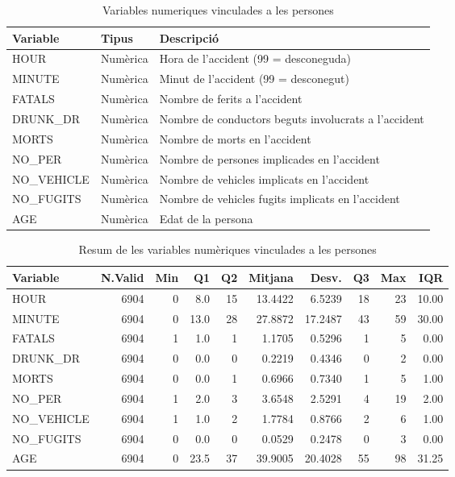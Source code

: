 \documentclass[11pt,longbibliography]{article}
\theoremstyle{definition}
\theoremstyle{remark}
\begin{document}
\begin{table}[H]
\centering
\begin{tabular}{lll}
\hline
Variable    & Tipus    & Descripció                                           \\ \hline
HOUR        & Numèrica & Hora de l’accident (99 = desconeguda)                \\
MINUTE      & Numèrica & Minut de l’accident (99 = desconegut)                \\
FATALS      & Numèrica & Nombre de ferits a l’accident                        \\
DRUNK\_DR   & Numèrica & Nombre de conductors beguts involucrats a l’accident \\
MORTS       & Numèrica & Nombre de morts en l’accident                        \\
NO\_PER     & Numèrica & Nombre de persones implicades en l’accident          \\
NO\_VEHICLE & Numèrica & Nombre de vehicles implicats en l’accident           \\
NO\_FUGITS  & Numèrica & Nombre de vehicles fugits implicats en l’accident    \\
AGE         & Numèrica & Edat de la persona                                   \\ \hline
\end{tabular}
\caption{Variables numeriques vinculades a les persones}
\label{tab:num3-table}
\end{table}

\begin{table}[H]
\centering
\begin{tabular}{lrrrrrrrrr}
\hline
Variable    & N.Valid & Min & Q1   & Q2 & Mitjana    & Desv. & Q3 & Max & IQR   \\ \hline
HOUR        & 6904    & 0   & 8.0  & 15      & 13.4422 & 6.5239       & 18 & 23  & 10.00 \\ \hline
MINUTE      & 6904    & 0   & 13.0 & 28      & 27.8872 & 17.2487      & 43 & 59  & 30.00 \\ \hline
FATALS      & 6904    & 1   & 1.0  & 1       & 1.1705  & 0.5296       & 1  & 5   & 0.00  \\ \hline
DRUNK\_DR   & 6904    & 0   & 0.0  & 0       & 0.2219  & 0.4346       & 0  & 2   & 0.00  \\ \hline
MORTS       & 6904    & 0   & 0.0  & 1       & 0.6966  & 0.7340       & 1  & 5   & 1.00  \\ \hline
NO\_PER     & 6904    & 1   & 2.0  & 3       & 3.6548  & 2.5291       & 4  & 19  & 2.00  \\ \hline
NO\_VEHICLE & 6904    & 1   & 1.0  & 2       & 1.7784  & 0.8766       & 2  & 6   & 1.00  \\ \hline
NO\_FUGITS  & 6904    & 0   & 0.0  & 0       & 0.0529  & 0.2478       & 0  & 3   & 0.00  \\ \hline
AGE         & 6904    & 0   & 23.5 & 37      & 39.9005 & 20.4028      & 55 & 98  & 31.25 \\ \hline
\end{tabular}
\caption{Resum de les variables numèriques vinculades a les persones}
\label{tab:num4-table}
\end{table}
\end{document}
